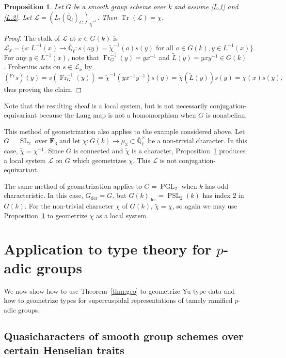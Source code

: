\documentclass[10pt]{amsart}
\theoremstyle{plain}
\newtheorem{proposition}[theorem]{Proposition}
\theoremstyle{definition}
\newcommand{\FFF}{{\mathbf{F}_3}}
\newcommand{\EE}{\mathbb{\bar Q}_\ell}
\newcommand{\EEx}{\EE^\times}
\newcommand{\Frob}[1]{\operatorname{Fr}_{#1}}
\DeclareMathOperator{\SL}{SL}
\DeclareMathOperator{\PGL}{PGL}
\DeclareMathOperator{\PSL}{PSL}
\newcommand{\der}{_{\operatorname{der}}}
\DeclareMathOperator{\Tr}{Tr}
\newcommand{\TrFrob}[1]{\Tr_{#1}}
\newcommand{\cs}[1]{{\mathcal{#1}}}
\begin{document}
\begin{proposition}\label{prop:chitilde}
Let $G$ be a smooth group scheme over $k$ and assume \ref{L.1} and \ref{L.2}.  Let $\cs{L} = (L_!(\EE)_G)_{\tilde{\chi}^{-1}}$.  Then $\TrFrob{}(\cs{L}) = \chi$.
\end{proposition}
\begin{proof}
The stalk of $\cs{L}$ at $x \in G(k)$ is
\[
\cs{L}_x = \{ s : L^{-1}(x) \to \EE : s(ay) = \tilde{\chi}^{-1}(a) s(y) \mbox{ for all $a \in G(k), y \in L^{-1}(x)$}\}.
\]
For any $y \in L^{-1}(x)$, note that $\Frob{G}^{-1}(y) = yx^{-1}$ and $\tilde{L}(y) = yxy^{-1} \in G(k)$.  Frobenius acts on $s \in \cs{L}_x$ by
\[
(^{\Frob{}}s)(y) = s(\Frob{G}^{-1}(y)) = \tilde{\chi}^{-1}(yx^{-1}y^{-1})s(y) = \tilde{\chi}(\tilde{L}(y))s(y) = \chi(x)s(y),
\]
thus proving the claim.
\end{proof}

Note that the resulting sheaf is a local system, but is not necessarily conjugation-equivariant because
the Lang map is not a homomorphism when $G$ is nonabelian.

This method of geometrization also applies to the example considered above.
Let $G = \SL_2$ over $\FFF$ and let $\chi : G(k) \to \mu_3 \subset \EEx$ be a non-trivial character.
In this case, $\tilde{\chi}= \chi^{-1}$. 
Since $G$ is connected and $\tilde{\chi}$ is a character, Proposition~\ref{prop:chitilde} produces a local system $\cs{L}$ on $G$ which geometrizes $\chi$.
This $\cs{L}$ is not conjugation-equivariant.

The same method of geometrization applies to $G = \PGL_2$ when $k$ has odd characteristic.
In this case, $G\der = G$, but $G(k)\der = \PSL_2(k)$ has index $2$ in $G(k)$.
For the non-trivial character $\chi$ of $G(k)$, $\tilde{\chi} = \chi$, so again we may use Proposition~\ref{prop:chitilde} to geometrize $\chi$ as a local system. 

\section{Application to type theory for \texorpdfstring{$p$}{p}-adic groups}\label{sec:types}

We now show how to use Theorem~\ref{thm:geo} to geometrize Yu type data and how to geometrize types for supercuspidal representations of tamely ramified $p$-adic groups.

\subsection{Quasicharacters of smooth group schemes over certain Henselian traits}\label{ssec:quasicharacters}
\end{document}
